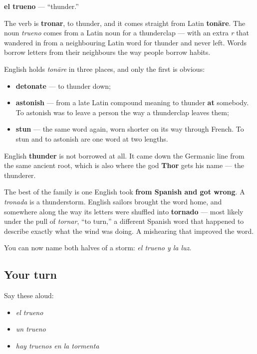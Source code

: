 \begin{cousinweb}
\textbf{el trueno} — \textquotedblleft{}thunder.\textquotedblright{}

The verb is \textbf{tronar}, to thunder, and it comes straight from Latin \textbf{tonāre}. The noun \emph{trueno} comes from a Latin noun for a thunderclap — with an extra \emph{r} that wandered in from a neighbouring Latin word for thunder and never left. Words borrow letters from their neighbours the way people borrow habits.

English holds \emph{tonāre} in three places, and only the first is obvious:

\begin{itemize}
\raggedright
  \item \textbf{detonate} — to thunder down;
  \item \textbf{astonish} — from a late Latin compound meaning to thunder \textbf{at} somebody. To astonish was to leave a person the way a thunderclap leaves them;
  \item \textbf{stun} — the same word again, worn shorter on its way through French. To stun and to astonish are one word at two lengths.
\end{itemize}

English \textbf{thunder} is not borrowed at all. It came down the Germanic line from the same ancient root, which is also where the god \textbf{Thor} gets his name — the thunderer.

The best of the family is one English took \textbf{from Spanish and got wrong}. A \emph{tronada} is a thunderstorm. English sailors brought the word home, and somewhere along the way its letters were shuffled into \textbf{tornado} — most likely under the pull of \emph{tornar}, \textquotedblleft{}to turn,\textquotedblright{} a different Spanish word that happened to describe exactly what the wind was doing. A mishearing that improved the word.
\end{cousinweb}

\begin{grammarlens}[title={What you've built}]
You can now name both halves of a storm: \emph{el trueno y la luz}.
\end{grammarlens}

\subsection*{Your turn}
Say these aloud:

\begin{itemize}
\raggedright
  \item \emph{el trueno}
  \item \emph{un trueno}
  \item \emph{hay truenos en la tormenta}
\end{itemize}

